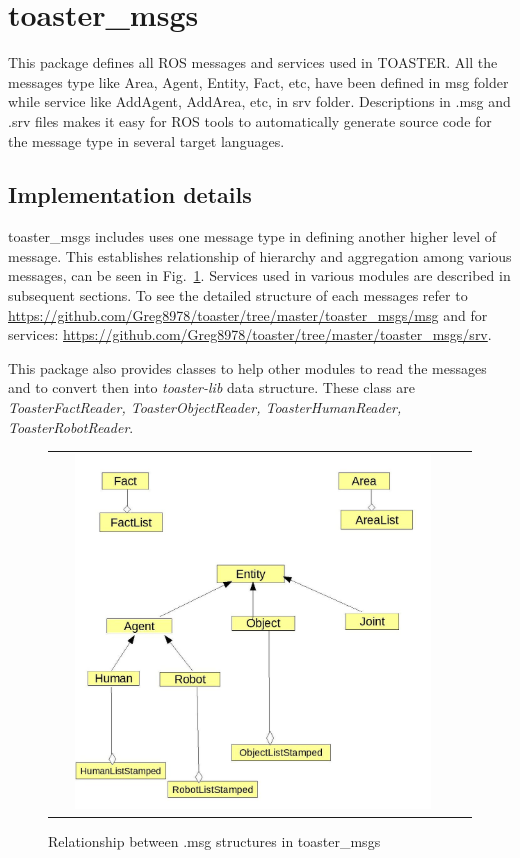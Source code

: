 \documentclass[a4paper]{article}
\begin{document}
\section{toaster\_msgs}
This package defines all ROS messages and services used in TOASTER. All the messages type like Area, Agent, Entity, Fact, etc, have been defined in msg folder while service like AddAgent, AddArea, etc, in srv folder. Descriptions in .msg and .srv files makes it easy for ROS tools to automatically generate source code for the message type in several target languages.


\subsection{Implementation details}

toaster\_msgs includes uses one message type in defining another higher level of message. This establishes relationship of hierarchy and aggregation among various messages, can be seen in Fig.~\ref{fig:relationship}. Services used in various modules are described in subsequent sections. To see the detailed structure of each messages refer to \url{https://github.com/Greg8978/toaster/tree/master/toaster_msgs/msg} and for services: \url{https://github.com/Greg8978/toaster/tree/master/toaster_msgs/srv}.

This package also provides classes to help other modules to read the messages and to convert then into \textit{toaster-lib} data structure.
These class are \textit{ToasterFactReader, ToasterObjectReader, ToasterHumanReader, ToasterRobotReader}. 

 \begin{figure}[ht!]
 \centering
 \begin{tabular}{cc}
  \includegraphics[width=0.90\textwidth]{img/msgRelationship.jpg}
 \end{tabular}
 \caption{Relationship between .msg structures in toaster\_msgs}
 \label{fig:relationship}
 \end{figure}
 
\end{document}
